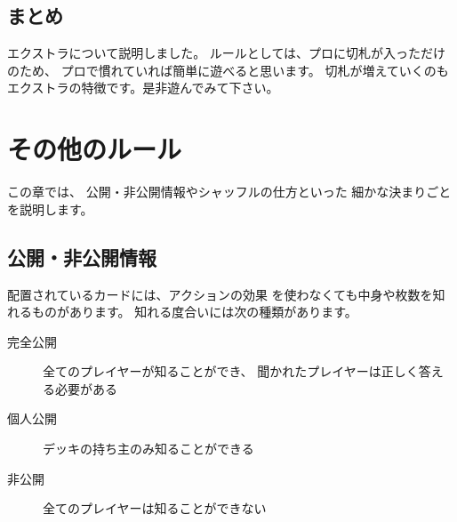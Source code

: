 \documentclass[letterpaper,10pt,dvipdfmx]{sphinxmanual}
\begin{document}
\subsection{まとめ}
\label{\detokenize{common/06-extra:id10}}
エクストラについて説明しました。
ルールとしては、プロに切札が入っただけのため、
プロで慣れていれば簡単に遊べると思います。
切札が増えていくのもエクストラの特徴です。是非遊んでみて下さい。


\section{その他のルール}
\label{\detokenize{common/07-etc:id1}}\label{\detokenize{common/07-etc::doc}}
この章では、
公開・非公開情報やシャッフルの仕方といった
細かな決まりごとを説明します。


\subsection{公開・非公開情報}
\label{\detokenize{common/07-etc:id2}}
配置されているカードには、アクションの効果
を使わなくても中身や枚数を知れるものがあります。
知れる度合いには次の種類があります。
\begin{description}
\item[{完全公開}] \leavevmode
全てのプレイヤーが知ることができ、
聞かれたプレイヤーは正しく答える必要がある

\item[{個人公開}] \leavevmode
デッキの持ち主のみ知ることができる

\item[{非公開}] \leavevmode
全てのプレイヤーは知ることができない

\end{description}
\end{document}
